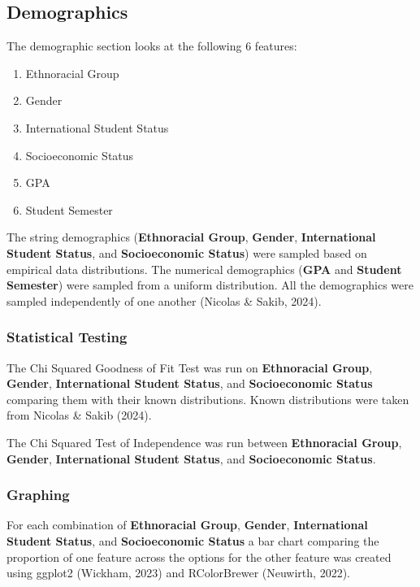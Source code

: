 \documentclass{article}
\providecommand{\tightlist}{%
  \setlength{\itemsep}{0pt}\setlength{\parskip}{0pt}}
\begin{document}
\subsection{Demographics}\label{demographics}

\label{sec:demographics}

The demographic section looks at the following 6 features:

\begin{enumerate}
\def\labelenumi{\arabic{enumi}.}
\tightlist
\item
  Ethnoracial Group
\item
  Gender
\item
  International Student Status
\item
  Socioeconomic Status
\item
  GPA
\item
  Student Semester
\end{enumerate}

The string demographics (\textbf{Ethnoracial Group}, \textbf{Gender}, \textbf{International Student Status}, and \textbf{Socioeconomic Status}) were sampled based on empirical data distributions. The numerical demographics (\textbf{GPA} and \textbf{Student Semester}) were sampled from a uniform distribution. All the demographics were sampled independently of one another (Nicolas \& Sakib, 2024).

\subsubsection{Statistical Testing}\label{statistical-testing}

The Chi Squared Goodness of Fit Test was run on \textbf{Ethnoracial Group}, \textbf{Gender}, \textbf{International Student Status}, and \textbf{Socioeconomic Status} comparing them with their known distributions. Known distributions were taken from Nicolas \& Sakib (2024).

The Chi Squared Test of Independence was run between \textbf{Ethnoracial Group}, \textbf{Gender}, \textbf{International Student Status}, and \textbf{Socioeconomic Status}.

\subsubsection{Graphing}\label{graphing}

For each combination of \textbf{Ethnoracial Group}, \textbf{Gender}, \textbf{International Student Status}, and \textbf{Socioeconomic Status} a bar chart comparing the proportion of one feature across the options for the other feature was created using ggplot2 (Wickham, 2023) and RColorBrewer (Neuwirth, 2022).
\end{document}
